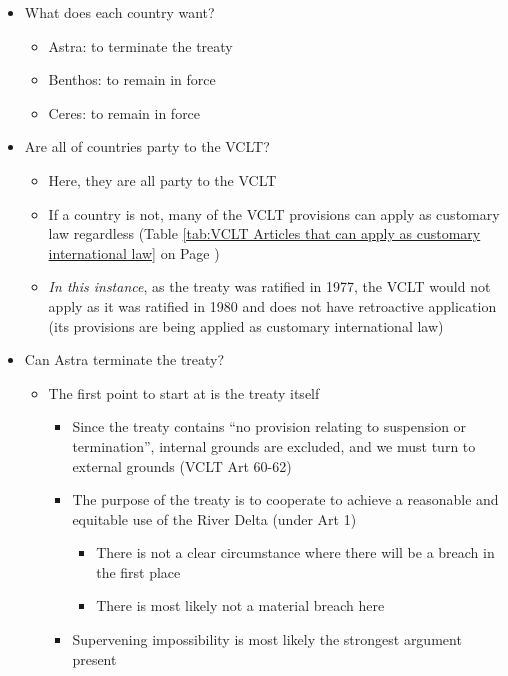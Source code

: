 \begin{itemize}
    \item What does each country want?
    \begin{itemize}
        \item Astra: to terminate the treaty
        \item Benthos: to remain in force
        \item Ceres: to remain in force
    \end{itemize}
    \item Are all of countries party to the VCLT?
    \begin{itemize}
        \item Here, they are all party to the VCLT
        \item If a country is not, many of the VCLT provisions can apply as customary law regardless (Table \ref{tab:VCLT Articles that can apply as customary international law} on Page \pageref{tab:VCLT Articles that can apply as customary international law})
        \item \textit{In this instance}, as the treaty was ratified in 1977, the VCLT would not apply as it was ratified in 1980 and does not have retroactive application (its provisions are being applied as customary international law)
    \end{itemize}
    \item Can Astra terminate the treaty?
    \begin{itemize}
        \item The first point to start at is the treaty itself
        \begin{itemize}
            \item Since the treaty contains ``no provision relating to suspension or termination'', internal grounds are excluded, and we must turn to external grounds (VCLT Art 60-62)
            \item The purpose of the treaty is to cooperate to achieve a reasonable and equitable use of the River Delta (under Art 1)
            \begin{itemize}
                \item There is not a clear circumstance where there will be a breach in the first place
                \item There is most likely not a material breach here
            \end{itemize}
            \item Supervening impossibility is most likely the strongest argument present

\end{itemize}
\end{itemize}
\end{itemize}
